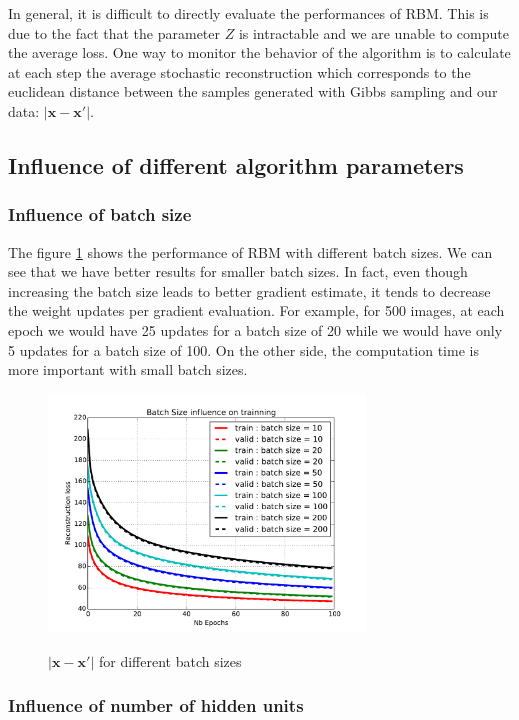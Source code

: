 \documentclass{article}
\begin{document}
In general, it is difficult to directly evaluate the performances of RBM. This is due to the fact that the parameter $Z$ is intractable and we are unable to compute the average loss. One way to monitor the behavior of the algorithm is to calculate at each step the average stochastic reconstruction which corresponds to the euclidean distance between the samples generated with Gibbs sampling and our data: $\lvert \mathbf{x} - \mathbf{x'} \rvert$.

\subsection{Influence of different algorithm parameters}

\subsubsection{Influence of batch size}
\label{subsubsec:BS}

The figure \ref{batch} shows the performance of RBM with different batch sizes. We can see that we have better results for smaller batch sizes. In fact, even though increasing the batch size leads to better gradient estimate, it tends to decrease the weight updates per gradient evaluation. For example, for 500 images, at each epoch we would have 25 updates for a batch size of 20 while we would have only 5 updates for a batch size of 100. On the other side, the computation time is more important with small batch sizes.

\begin{figure}
\centering
\includegraphics[width=0.75\textwidth]{batchsize}
\label{batch}
\caption{$\lvert \mathbf{x} - \mathbf{x'} \rvert$ for different batch sizes}
\end{figure}

\subsubsection{Influence of number of hidden units}
\end{document}
